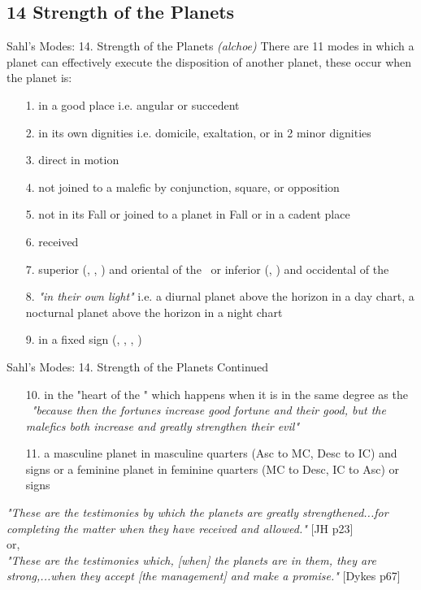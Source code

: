 \subsection{14 Strength of the Planets}
\begin{frame}[t]{Sahl's Modes: 14. Strength of the Planets}
\textsl{(alchoe)} There are 11 modes in which a planet can effectively execute the disposition of another planet, these occur when the planet is:
\begin{enumerate}
\item[1.] in a good place i.e. angular or succedent
\item[2.] in its own dignities i.e. domicile, exaltation, or in 2 minor dignities
\item[3.] direct in motion
\item[4.] not joined to a malefic by conjunction, square, or opposition
\item[5.] not in its Fall or joined to a planet in Fall or in a cadent place
\item[6.] received
\item[7.] superior (\Mars, \Jupiter, \Saturn) and oriental of the \Sun\ or inferior (\Mercury, \Venus) and occidental of the \Sun
\item[8.] \textsl{"in their own light"} i.e. a diurnal planet above the horizon in a day chart, a nocturnal planet above the horizon in a night chart
\item[9.] in a fixed sign (\Taurus, \Leo, \Scorpio, \Aquarius)
\end{enumerate}
\end{frame}
\begin{frame}[t]{Sahl's Modes: 14. Strength of the Planets Continued}
\begin{enumerate}
\item[10.] in the "heart of the \Sun" which happens when it is in the same degree as the \Sun\ \textsl{"because then the fortunes increase good fortune and their good, but the malefics both increase and greatly strengthen their evil"}\footnotemark[1]

\item[11.] a masculine planet in masculine quarters (Asc to MC, Desc to IC) and signs or a feminine planet in feminine quarters (MC to Desc, IC to Asc) or signs
\end{enumerate}
\textsl{"These are the testimonies by which the planets are greatly strengthened...for completing the matter when they have received and allowed."} [JH p23] \\ 
or, \\
\textsl{"These are the testimonies which, [when] the planets are in them, they are strong,...when they accept [the management] and make a promise."} [Dykes p67]


\end{frame}
